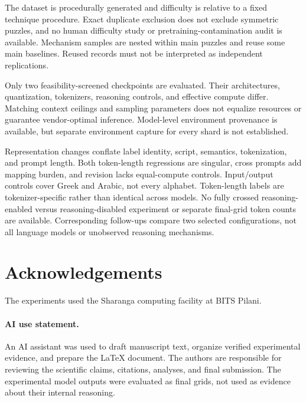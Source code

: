 \documentclass[11pt]{article}
\begin{document}
The dataset is procedurally generated and difficulty is relative to a fixed technique procedure. Exact duplicate exclusion does not exclude symmetric puzzles, and no human difficulty study or pretraining-contamination audit is available. Mechanism samples are nested within main puzzles and reuse some main baselines. Reused records must not be interpreted as independent replications.

Only two feasibility-screened checkpoints are evaluated. Their architectures, quantization, tokenizers, reasoning controls, and effective compute differ. Matching context ceilings and sampling parameters does not equalize resources or guarantee vendor-optimal inference. Model-level environment provenance is available, but separate environment capture for every shard is not established.

Representation changes conflate label identity, script, semantics, tokenization, and prompt length. Both token-length regressions are singular, cross prompts add mapping burden, and revision lacks equal-compute controls. Input/output controls cover Greek and Arabic, not every alphabet. Token-length labels are tokenizer-specific rather than identical across models. No fully crossed reasoning-enabled versus reasoning-disabled experiment or separate final-grid token counts are available. Corresponding follow-ups compare two selected configurations, not all language models or unobserved reasoning mechanisms.

\section*{Acknowledgements}
The experiments used the Sharanga computing facility at BITS Pilani.

\paragraph{AI use statement.} An AI assistant was used to draft manuscript text, organize verified experimental evidence, and prepare the LaTeX document. The authors are responsible for reviewing the scientific claims, citations, analyses, and final submission. The experimental model outputs were evaluated as final grids, not used as evidence about their internal reasoning.



\clearpage
\appendix
\end{document}
